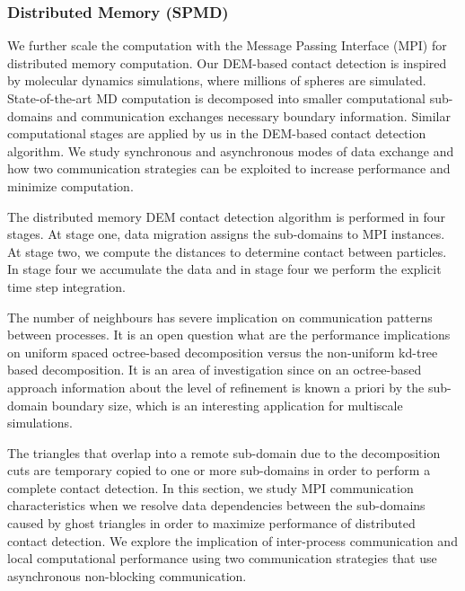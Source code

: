 \documentclass[times,12pt]{article}
\begin{document}
\clearpage


\subsubsection{Distributed Memory (SPMD)}

We further scale the computation with the Message Passing Interface (MPI) \cite{Forum:1994:MMI:898758} for distributed memory computation. Our DEM-based contact detection is inspired by molecular dynamics simulations, where millions of spheres are simulated. State-of-the-art MD computation is decomposed into smaller computational sub-domains and communication exchanges necessary boundary information. Similar computational stages are applied by us in the DEM-based contact detection algorithm. We study synchronous and asynchronous modes of data exchange and how two communication strategies can be exploited to increase performance and minimize computation.




The distributed memory DEM contact detection algorithm is performed in four stages. At stage one, data migration assigns the sub-domains to MPI instances. At stage two, we compute the distances to determine contact between particles. In stage four we accumulate the data and in stage four we perform the explicit time step integration.

The number of neighbours has severe implication on communication patterns between processes. It is an open question what are the performance implications on uniform spaced octree-based decomposition versus the non-uniform kd-tree based decomposition. It is an area of investigation since on an octree-based approach information about the level of refinement is known a priori by the sub-domain boundary size, which is an interesting application for multiscale simulations. 

\label{Unstructured Domain Decomposition}

The triangles that overlap into a remote sub-domain due to the decomposition cuts are temporary copied to one or more sub-domains in order to perform a complete contact detection. In this section, we study MPI communication characteristics when we resolve data dependencies between the sub-domains caused by ghost triangles in order to maximize performance of distributed contact detection. We explore the implication of inter-process communication and local computational performance using two communication strategies that use asynchronous non-blocking communication.
\end{document}
